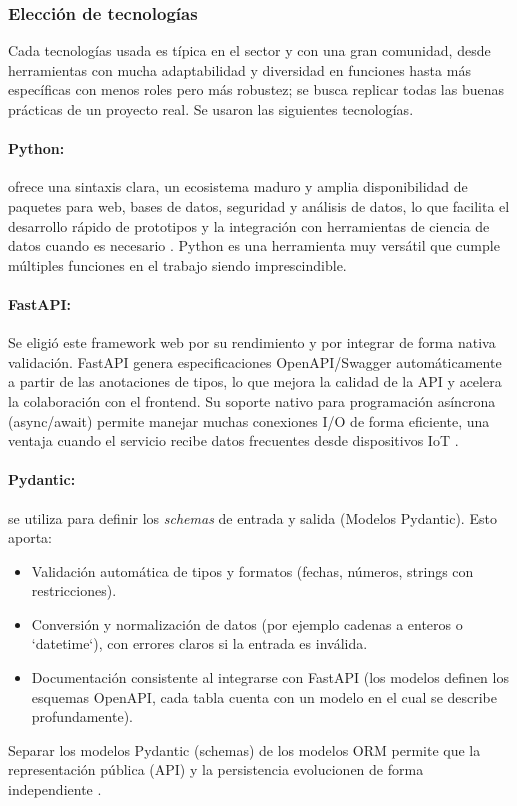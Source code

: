 \documentclass[12pt, a4paper]{article}
\begin{document}
\subsubsection{Elección de tecnologías}

Cada tecnologías usada es típica en el sector y con una gran comunidad, desde herramientas con mucha adaptabilidad y diversidad en funciones hasta más específicas con menos roles pero más robustez; se busca replicar todas las buenas prácticas de un proyecto real. Se usaron las siguientes tecnologías.

\paragraph{Python:}
 ofrece una sintaxis clara, un ecosistema maduro y amplia disponibilidad de paquetes para web, bases de datos, seguridad y análisis de datos, lo que facilita el desarrollo rápido de prototipos y la integración con herramientas de ciencia de datos cuando es necesario \cite{PythonDoc}. Python es una herramienta muy versátil que cumple múltiples funciones en el trabajo siendo imprescindible.

\paragraph{FastAPI:}
Se eligió este framework web por su rendimiento y por integrar de forma nativa validación. FastAPI genera especificaciones OpenAPI/Swagger automáticamente a partir de las anotaciones de tipos, lo que mejora la calidad de la API y acelera la colaboración con el frontend. Su soporte nativo para programación asíncrona (async/await) permite manejar muchas conexiones I/O de forma eficiente, una ventaja cuando el servicio recibe datos frecuentes desde dispositivos IoT \cite{FastAPI}.

\paragraph{Pydantic:} se utiliza para definir los \emph{schemas} de entrada y salida (Modelos Pydantic). Esto aporta:
\begin{itemize}
	\item Validación automática de tipos y formatos (fechas, números, strings con restricciones).
	\item Conversión y normalización de datos (por ejemplo cadenas a enteros o `datetime`), con errores claros si la entrada es inválida.
	\item Documentación consistente al integrarse con FastAPI (los modelos definen los esquemas OpenAPI, cada tabla cuenta con un modelo en el cual se describe profundamente).
\end{itemize}
Separar los modelos Pydantic (schemas) de los modelos ORM permite que la representación pública (API) y la persistencia evolucionen de forma independiente \cite{Pydantic}.
\end{document}

